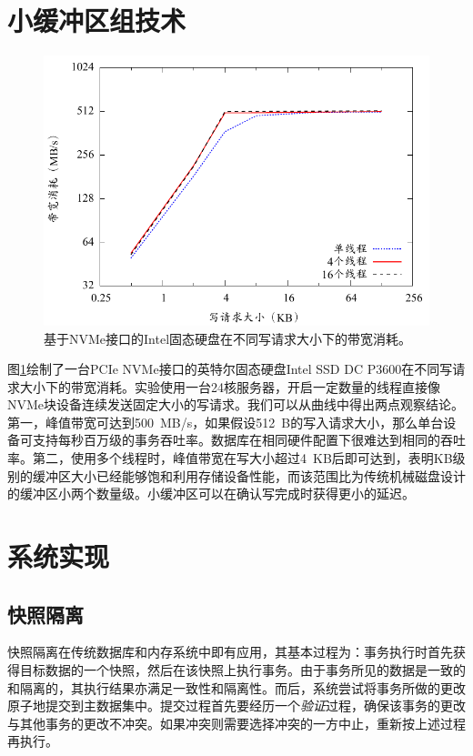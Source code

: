 \section{小缓冲区组技术}

\begin{figure}[t]
\centering
\includegraphics[width=0.9\columnwidth]{figures/nvme-bandwidth}
\caption{基于NVMe接口的Intel固态硬盘在不同写请求大小下的带宽消耗。}
\label{fig-nvme-bandwidth}
\end{figure}

图\ref{fig-nvme-bandwidth}绘制了一台PCIe NVMe接口的英特尔固态硬盘Intel SSD DC P3600在不同写请求大小下的带宽消耗。实验使用一台24核服务器，开启一定数量的线程直接像NVMe块设备连续发送固定大小的写请求。我们可以从曲线中得出两点观察结论。第一，峰值带宽可达到500~MB/s，如果假设512~B的写入请求大小，那么单台设备可支持每秒百万级的事务吞吐率。数据库在相同硬件配置下很难达到相同的吞吐率。第二，使用多个线程时，峰值带宽在写大小超过4~KB后即可达到，表明KB级别的缓冲区大小已经能够饱和利用存储设备性能，而该范围比为传统机械磁盘设计的缓冲区小两个数量级。小缓冲区可以在确认写完成时获得更小的延迟。

\section{系统实现}

\subsection{快照隔离}
\label{subsec:sba-si}

快照隔离在传统数据库和内存系统中即有应用\cite{Daudjee:2006:LDR:1182635.1164189, Fekete:2005:MSI:1071610.1071615, Ports:2012:SSI:2367502.2367523, Litz:2014:SRT:2541940.2541952}，其基本过程为：事务执行时首先获得目标数据的一个快照，然后在该快照上执行事务。由于事务所见的数据是一致的和隔离的，其执行结果亦满足一致性和隔离性。而后，系统尝试将事务所做的更改原子地提交到主数据集中。提交过程首先要经历一个\emph{验证}过程，确保该事务的更改与其他事务的更改不冲突。如果冲突则需要选择冲突的一方中止，重新按上述过程再执行。

